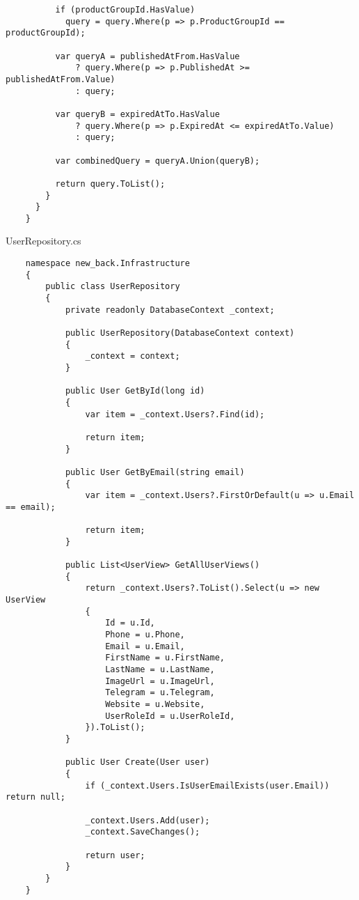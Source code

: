 \begin{lstlisting}
          if (productGroupId.HasValue)
            query = query.Where(p => p.ProductGroupId == productGroupId);
    
          var queryA = publishedAtFrom.HasValue
              ? query.Where(p => p.PublishedAt >= publishedAtFrom.Value)
              : query;
    
          var queryB = expiredAtTo.HasValue
              ? query.Where(p => p.ExpiredAt <= expiredAtTo.Value)
              : query;
    
          var combinedQuery = queryA.Union(queryB);
    
          return query.ToList();
        }
      }
    }
\end{lstlisting}

UserRepository.cs
\lstset{style=sharpc}
\begin{lstlisting}
    namespace new_back.Infrastructure
    {
        public class UserRepository
        {
            private readonly DatabaseContext _context;
            
            public UserRepository(DatabaseContext context)
            {
                _context = context;
            }
            
            public User GetById(long id)
            {
                var item = _context.Users?.Find(id);
    
                return item;
            }
            
            public User GetByEmail(string email)
            {
                var item = _context.Users?.FirstOrDefault(u => u.Email == email);
    
                return item;
            }
            
            public List<UserView> GetAllUserViews()
            {
                return _context.Users?.ToList().Select(u => new UserView
                {
                    Id = u.Id,
                    Phone = u.Phone,
                    Email = u.Email,
                    FirstName = u.FirstName,
                    LastName = u.LastName,
                    ImageUrl = u.ImageUrl,
                    Telegram = u.Telegram,
                    Website = u.Website,
                    UserRoleId = u.UserRoleId,
                }).ToList();
            }
            
            public User Create(User user)
            {
                if (_context.Users.IsUserEmailExists(user.Email)) return null;
                
                _context.Users.Add(user);
                _context.SaveChanges();
    
                return user;
            }
        }
    }
\end{lstlisting}

